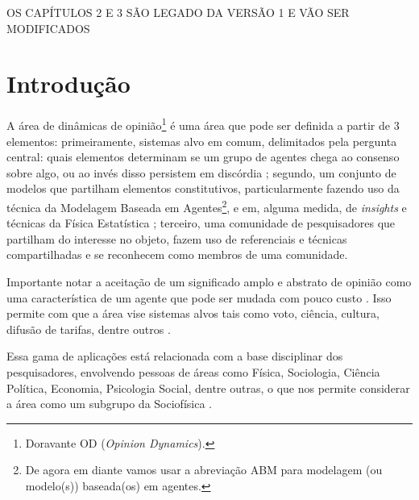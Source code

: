 
\begin{tcolorbox}[{colback=yellow!10!white,
colframe=yellow!75!black}]
OS CAPÍTULOS 2 E 3 SÃO LEGADO DA VERSÃO 1 E VÃO SER MODIFICADOS
\end{tcolorbox}




\section{Introdução}

A área de dinâmicas de opinião\footnote{Doravante OD (\textit{Opinion
    Dynamics}).} é uma área que pode ser definida a partir de 3 elementos:
primeiramente, sistemas alvo em comum, delimitados pela pergunta central: quais
elementos determinam se um grupo de agentes chega ao consenso sobre algo, ou ao
invés disso persistem em discórdia \cite{castellano2012social} ; segundo, um
conjunto de modelos que partilham elementos constitutivos, particularmente
fazendo uso da técnica da Modelagem Baseada em Agentes\footnote{De agora em
  diante vamos usar a abreviação ABM para modelagem (ou modelo(s)) baseada(os)
  em agentes.}, e em, alguma medida, de \textit{insights} e técnicas da Física
Estatística \cite{galam1990social}; terceiro, uma comunidade de pesquisadores
que partilham do interesse no objeto, fazem uso de referenciais e técnicas
compartilhadas e se reconhecem como membros de uma comunidade.

Importante notar a aceitação de um significado amplo e abstrato de opinião como
uma característica de um agente que pode ser mudada com pouco custo
\cite[p.312]{castellano2012social}. Isso permite com que a área vise sistemas
alvos tais como voto, ciência, cultura, difusão de tarifas, dentre
outros
\cite{kowalska2013going,martins2015thou,axelrod1997dissemination,galam1990social}.

Essa gama de aplicações está relacionada com a base disciplinar dos pesquisadores,
envolvendo pessoas de áreas como Física, Sociologia, Ciência Política, Economia,
Psicologia Social, dentre outras, o que nos permite considerar a área como um
subgrupo da Sociofísica \cite{galam1982sociophysics,galam2012sociophysics}.


